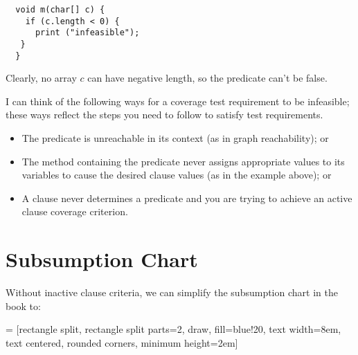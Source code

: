 \documentclass[11pt]{article}
\begin{document}
\begin{lstlisting}
  void m(char[] c) {
    if (c.length < 0) {
      print ("infeasible");
   }
  }
\end{lstlisting}

Clearly, no array $c$ can have negative length, so the predicate can't
be false.

I can think of the following ways for a coverage test requirement to 
be infeasible; these ways reflect the steps you need to follow to satisfy
test requirements.
\begin{itemize}
\item The predicate is unreachable in its context (as in graph reachability); or
\item The method containing the predicate never assigns appropriate values
to its variables to cause the desired clause values (as in the example above); or
\item A clause never determines a predicate and you are trying to achieve an active clause coverage criterion.
\end{itemize}

\clearpage

\section*{Subsumption Chart}
Without inactive clause criteria, we can simplify the
subsumption chart in the book to:

 = [rectangle split, rectangle split parts=2, draw, fill=blue!20, 
    text width=8em, text centered, rounded corners, minimum height=2em]

\begin{center}
\end{center}
\end{document}
